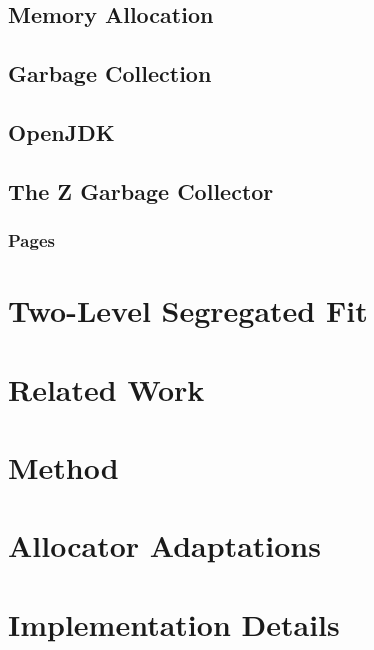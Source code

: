 \documentclass[a4paper,12pt]{article}
\begin{document}
\subsection{Memory Allocation}
\label{sec:memory_allocation}


\newpage
\subsection{Garbage Collection}
\label{sec:gc}


\subsection{OpenJDK}
\label{sec:openjdk}


\subsection{The Z Garbage Collector}
\label{sec:zgc}


\subsubsection{Pages}
\label{sec:zpage}


\section{Two-Level Segregated Fit}
\label{sec:tlsf}


\section{Related Work}
\label{sec:related-work}


\newpage

\section{Method}
\label{sec:method}


\section{Allocator Adaptations}
\label{sec:adaptations}


\section{Implementation Details}
\label{sec:adaptations-impl}

\end{document}
